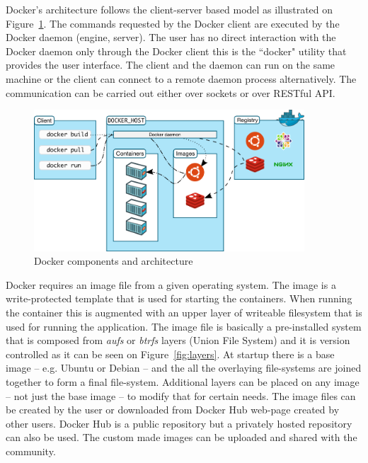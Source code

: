 \documentclass[a4paper]{article}
\begin{document}
Docker's architecture follows the client-server based model as illustrated on Figure~\ref{fig:arch}. The commands requested by the Docker client are executed by the Docker daemon (engine, server).
The user has no direct interaction with the Docker daemon only through the Docker client this is the ``docker" utility that provides the 
user interface. The client and the daemon can run on the same machine or the client can connect to a remote daemon process alternatively. The communication can be carried out either over sockets or over RESTful API.

\begin{figure}[H]
    \centering
    \includegraphics[width=0.9\textwidth]{figures/docker_arch.png}
    \caption{Docker components and architecture}
    \label{fig:arch}
\end{figure}

Docker requires an image file from a given operating system. The image is a write-protected template that is used for starting the containers.
When running the container this is augmented with an upper layer of writeable filesystem that is used for running the application. The image file
is basically a pre-installed system that is composed from \emph{aufs} or \emph{btrfs} layers (Union File System) and it is version controlled as it can be seen on Figure~\ref{fig:layers}.
At startup there is a base image -- e.g. Ubuntu or Debian -- and the all the overlaying file-systems are joined together to form a final file-system. Additional layers can be placed on any image -- not just the base image -- to modify that for certain needs. The image files can be created by the user or downloaded from Docker Hub web-page created by other users. Docker Hub is a public repository but a privately hosted repository can also be used. The custom made images can be uploaded and shared with the community.
\end{document}
